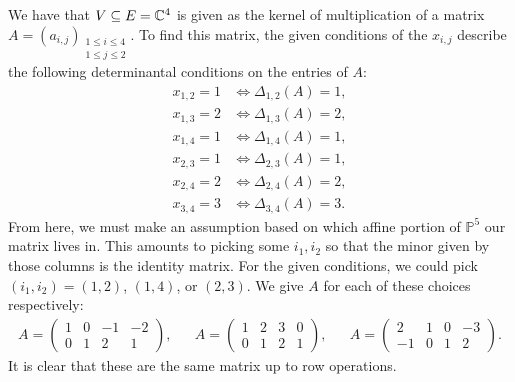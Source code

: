\documentclass[letterpaper, 11pt, oneside]{book}
\begin{document}
\begin{sol}\label{ex:YT_9.1.2}
  We have that $V \subseteq E = \mathbb{C}^{4}$ is given as the kernel of multiplication of a matrix $A = (a_{i, j})_{\substack{1 \leq i \leq 4 \\ 1 \leq j \leq 2}}$.
  To find this matrix, the given conditions of the $x_{i, j}$ describe the following determinantal conditions on the entries of $A$:
  \begin{align*}
    x_{1, 2} = 1 &\iff \Delta_{1, 2}(A) = 1, \\
    x_{1, 3} = 2 &\iff \Delta_{1, 3}(A) = 2, \\
    x_{1, 4} = 1 &\iff \Delta_{1, 4}(A) = 1, \\
    x_{2, 3} = 1 &\iff \Delta_{2, 3}(A) = 1, \\
    x_{2, 4} = 2 &\iff \Delta_{2, 4}(A) = 2, \\
    x_{3, 4} = 3 &\iff \Delta_{3, 4}(A) = 3.
  \end{align*}
  From here, we must make an assumption based on which affine portion of $\mathbb{P}^{5}$ our matrix lives in.
  This amounts to picking some $i_{1}, i_{2}$ so that the minor given by those columns is the identity matrix.
  For the given conditions, we could pick $(i_{1}, i_{2}) = (1, 2)$, $(1, 4)$, or $(2, 3)$.
  We give $A$ for each of these choices respectively:
  \begin{align*}
    A =
    \begin{pmatrix}
      1 & 0 & -1 & -2 \\
      0 & 1 & 2 & 1
    \end{pmatrix},
    &&
    A =
    \begin{pmatrix}
      1 & 2 & 3 & 0 \\
      0 & 1 & 2 & 1
    \end{pmatrix},
    &&
    A =
    \begin{pmatrix}
      2 & 1 & 0 & -3 \\
      -1 & 0 & 1 & 2
    \end{pmatrix}.
  \end{align*}
  It is clear that these are the same matrix up to row operations.
\end{sol}
\end{document}
